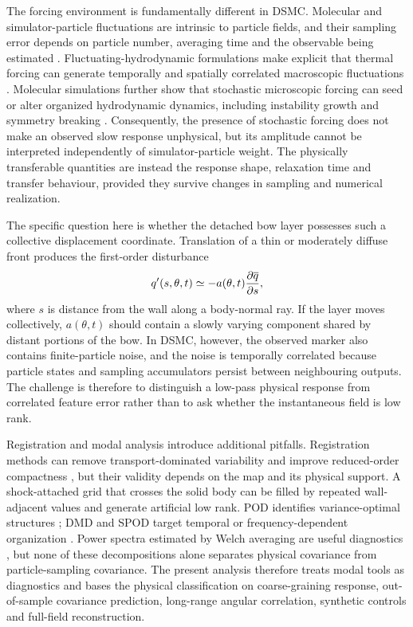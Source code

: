 The forcing environment is fundamentally different in DSMC. Molecular and simulator-particle fluctuations are intrinsic to particle fields, and their sampling error depends on particle number, averaging time and the observable being estimated \citep{Stefanov2000,Hadjiconstantinou2003}. Fluctuating-hydrodynamic formulations make explicit that thermal forcing can generate temporally and spatially correlated macroscopic fluctuations \citep{BellGarciaWilliams2007,WilliamsBellGarcia2008,Bell2022}. Molecular simulations further show that stochastic microscopic forcing can seed or alter organized hydrodynamic dynamics, including instability growth and symmetry breaking \citep{Gallis2016,Gallis2017,Gallis2021}. Consequently, the presence of stochastic forcing does not make an observed slow response unphysical, but its amplitude cannot be interpreted independently of simulator-particle weight. The physically transferable quantities are instead the response shape, relaxation time and transfer behaviour, provided they survive changes in sampling and numerical realization.

The specific question here is whether the detached bow layer possesses such a collective displacement coordinate. Translation of a thin or moderately diffuse front produces the first-order disturbance
\begin{equation}
 q'(s,\theta,t)\simeq-a(\theta,t)\frac{\partial \overline{q}}{\partial s},
 \label{eq:translation}
\end{equation}
where $s$ is distance from the wall along a body-normal ray. If the layer moves collectively, $a(\theta,t)$ should contain a slowly varying component shared by distant portions of the bow. In DSMC, however, the observed marker also contains finite-particle noise, and the noise is temporally correlated because particle states and sampling accumulators persist between neighbouring outputs. The challenge is therefore to distinguish a low-pass physical response from correlated feature error rather than to ask whether the instantaneous field is low rank.

Registration and modal analysis introduce additional pitfalls. Registration methods can remove transport-dominated variability and improve reduced-order compactness \citep{RowleyMarsden2000,Reiss2018,Taddei2020}, but their validity depends on the map and its physical support. A shock-attached grid that crosses the solid body can be filled by repeated wall-adjacent values and generate artificial low rank. POD identifies variance-optimal structures \citep{Lumley1967,Sirovich1987,Berkooz1993,Taira2017}; DMD and SPOD target temporal or frequency-dependent organization \citep{Schmid2010,Towne2018,SchmidtColonius2020}. Power spectra estimated by Welch averaging are useful diagnostics \citep{Welch1967}, but none of these decompositions alone separates physical covariance from particle-sampling covariance. The present analysis therefore treats modal tools as diagnostics and bases the physical classification on coarse-graining response, out-of-sample covariance prediction, long-range angular correlation, synthetic controls and full-field reconstruction.

